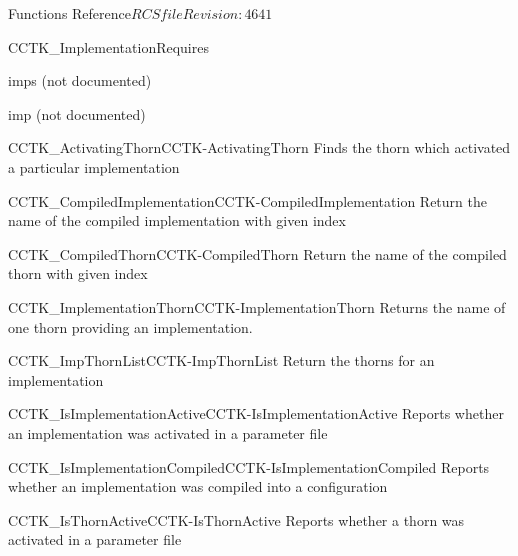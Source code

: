 \begin{cactuspart}{ Functions Reference}{$RCSfile$}{$Revision: 4641 $}
\begin{FunctionDescription}{CCTK\_ImplementationRequires}
\begin{ResultSection}
\begin{Result}{imps}
(not documented)
\end{Result}
\end{ResultSection}

\begin{ParameterSection}
\begin{Parameter}{imp}
(not documented)
\end{Parameter}
\end{ParameterSection}


\begin{SeeAlsoSection}
\begin{SeeAlso2}{CCTK\_ActivatingThorn}{CCTK-ActivatingThorn}
  Finds the thorn which activated a particular implementation
\end{SeeAlso2}
\begin{SeeAlso2}{CCTK\_CompiledImplementation}{CCTK-CompiledImplementation}
  Return the name of the compiled implementation with given index
\end{SeeAlso2}
\begin{SeeAlso2}{CCTK\_CompiledThorn}{CCTK-CompiledThorn}
  Return the name of the compiled thorn with given index
\end{SeeAlso2}
\begin{SeeAlso2}{CCTK\_ImplementationThorn}{CCTK-ImplementationThorn}
  Returns the name of one thorn providing an implementation.
\end{SeeAlso2}
\begin{SeeAlso2}{CCTK\_ImpThornList}{CCTK-ImpThornList}
  Return the thorns for an implementation
\end{SeeAlso2}
\begin{SeeAlso2}{CCTK\_IsImplementationActive}{CCTK-IsImplementationActive}
  Reports whether an implementation was activated in a parameter file
\end{SeeAlso2}
\begin{SeeAlso2}{CCTK\_IsImplementationCompiled}{CCTK-IsImplementationCompiled}
  Reports whether an implementation was compiled into a configuration
\end{SeeAlso2}
\begin{SeeAlso2}{CCTK\_IsThornActive}{CCTK-IsThornActive}
  Reports whether a thorn was activated in a parameter file
\end{SeeAlso2}

\end{SeeAlsoSection}
\end{FunctionDescription}
\end{cactuspart}
